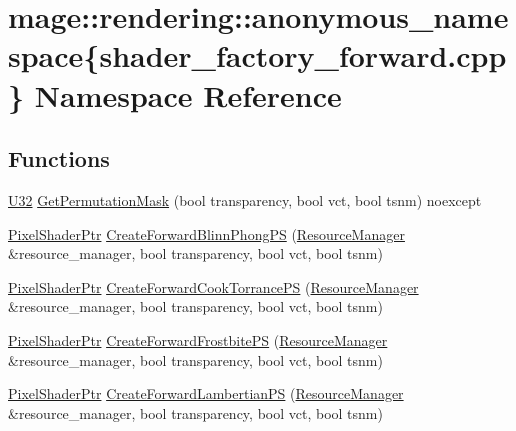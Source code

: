 \hypertarget{namespacemage_1_1rendering_1_1anonymous__namespace_02shader__factory__forward_8cpp_03}{}\section{mage\+:\+:rendering\+:\+:anonymous\+\_\+namespace\{shader\+\_\+factory\+\_\+forward.\+cpp\} Namespace Reference}
\label{namespacemage_1_1rendering_1_1anonymous__namespace_02shader__factory__forward_8cpp_03}
\subsection*{Functions}
\begin{DoxyCompactItemize}
\item 
\mbox{\hyperlink{namespacemage_aa5d6eaabaac3cdd01873d6a3d27e90f3}{U32}} \mbox{\hyperlink{namespacemage_1_1rendering_1_1anonymous__namespace_02shader__factory__forward_8cpp_03_a56555da6c6f92ea3239083ac75a77d9a}{Get\+Permutation\+Mask}} (bool transparency, bool vct, bool tsnm) noexcept
\item 
\mbox{\hyperlink{namespacemage_1_1rendering_af03d922b228ee9c8542baaa2ecc9f259}{Pixel\+Shader\+Ptr}} \mbox{\hyperlink{namespacemage_1_1rendering_1_1anonymous__namespace_02shader__factory__forward_8cpp_03_a2381624b5b7f34a6c489f385c4dac6f6}{Create\+Forward\+Blinn\+Phong\+PS}} (\mbox{\hyperlink{classmage_1_1rendering_1_1_resource_manager}{Resource\+Manager}} \&resource\+\_\+manager, bool transparency, bool vct, bool tsnm)
\item 
\mbox{\hyperlink{namespacemage_1_1rendering_af03d922b228ee9c8542baaa2ecc9f259}{Pixel\+Shader\+Ptr}} \mbox{\hyperlink{namespacemage_1_1rendering_1_1anonymous__namespace_02shader__factory__forward_8cpp_03_a52a0ab44b576a680b505c648c14c7edd}{Create\+Forward\+Cook\+Torrance\+PS}} (\mbox{\hyperlink{classmage_1_1rendering_1_1_resource_manager}{Resource\+Manager}} \&resource\+\_\+manager, bool transparency, bool vct, bool tsnm)
\item 
\mbox{\hyperlink{namespacemage_1_1rendering_af03d922b228ee9c8542baaa2ecc9f259}{Pixel\+Shader\+Ptr}} \mbox{\hyperlink{namespacemage_1_1rendering_1_1anonymous__namespace_02shader__factory__forward_8cpp_03_ae2e4146ea74cc5301a470cc0e3b82d23}{Create\+Forward\+Frostbite\+PS}} (\mbox{\hyperlink{classmage_1_1rendering_1_1_resource_manager}{Resource\+Manager}} \&resource\+\_\+manager, bool transparency, bool vct, bool tsnm)
\item 
\mbox{\hyperlink{namespacemage_1_1rendering_af03d922b228ee9c8542baaa2ecc9f259}{Pixel\+Shader\+Ptr}} \mbox{\hyperlink{namespacemage_1_1rendering_1_1anonymous__namespace_02shader__factory__forward_8cpp_03_a24bf750b201b5d310ecb7c7c736d6999}{Create\+Forward\+Lambertian\+PS}} (\mbox{\hyperlink{classmage_1_1rendering_1_1_resource_manager}{Resource\+Manager}} \&resource\+\_\+manager, bool transparency, bool vct, bool tsnm)
\end{DoxyCompactItemize}


